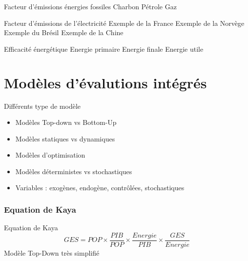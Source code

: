 \documentclass{beamer}
\begin{document}
\begin{frame}{Facteur d'émissions énergies fossiles}
Charbon
Pétrole
Gaz
\end{frame}

\begin{frame}{Facteur d'émissions de l'électricité}
Exemple de la France
Exemple de la Norvège
Exemple du Brésil
Exemple de la Chine
\end{frame}

\begin{frame}{Efficacité énergétique}
Energie primaire
Energie finale
Energie utile
\end{frame}

\section{Modèles d'évalutions intégrés}

\begin{frame}{Différents type de modèle}
\begin{itemize}
 \item Modèles Top-down vs Bottom-Up
 \item Modèles statiques vs dynamiques
 \item Modèles d'optimisation
 \item Modèles déterministes vs stochastiques
 \item Variables : exogènes, endogène, contrôlées, stochastiques
\end{itemize}
\end{frame}



\begin{frame}
\frametitle{Equation de Kaya}
Equation de Kaya
\begin{equation*}
GES=POP \times \frac{PIB}{POP} \times \frac{Energie}{PIB}\times \frac{GES}{Energie}
\end{equation*}
\pause
Modèle Top-Down très simplifié
\end{frame}
\end{document}
